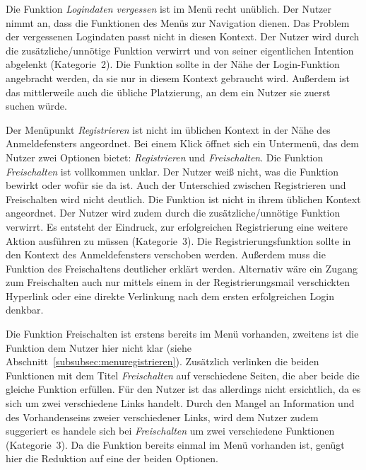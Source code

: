 {Die Funktion \emph{Logindaten vergessen} ist im Menü recht unüblich. Der Nutzer nimmt an, dass die Funktionen des Menüs zur Navigation dienen. Das Problem der vergessenen Logindaten passt nicht in diesen Kontext.
}
{Der Nutzer wird durch die zusätzliche/unnötige Funktion verwirrt und von seiner eigentlichen Intention abgelenkt (Kategorie~2).
}
{Die Funktion sollte in der Nähe der Login-Funktion angebracht werden, da sie nur in diesem Kontext gebraucht wird. Außerdem ist das mittlerweile auch die übliche Platzierung, an dem ein Nutzer sie zuerst suchen würde.
}\label{prob:start:pkt:login}

{Der Menüpunkt \emph{Registrieren} ist nicht im üblichen Kontext in der Nähe des Anmeldefensters angeordnet. Bei einem Klick öffnet sich ein Untermenü, das dem Nutzer zwei Optionen bietet: \emph{Registrieren} und \emph{Freischalten}.
Die Funktion \emph{Freischalten} ist vollkommen unklar. Der Nutzer weiß nicht, was die Funktion bewirkt oder wofür sie da ist. Auch der Unterschied zwischen Registrieren und Freischalten wird nicht deutlich.
}{Die Funktion ist nicht in ihrem üblichen Kontext angeordnet. Der Nutzer wird zudem durch die zusätzliche/unnötige Funktion verwirrt. Es entsteht der Eindruck, zur erfolgreichen Registrierung eine weitere Aktion ausführen zu müssen (Kategorie~3).}
{Die Registrierungsfunktion sollte in den Kontext des Anmeldefensters verschoben werden. Außerdem muss die Funktion des Freischaltens deutlicher erklärt werden. Alternativ wäre ein Zugang zum Freischalten auch nur mittels einem in der Registrierungsmail verschickten Hyperlink oder eine direkte Verlinkung nach dem ersten erfolgreichen Login denkbar.
}\label{prob:start:pkt:reg}

{Die Funktion Freischalten ist erstens bereits im Menü vorhanden, zweitens ist die Funktion dem Nutzer hier nicht klar (siehe Abschnitt~\ref{subsubsec:menuregistrieren}). 
Zusätzlich verlinken die beiden Funktionen mit dem Titel \emph{Freischalten} auf verschiedene Seiten, die aber beide die gleiche Funktion erfüllen. Für den Nutzer ist das allerdings nicht ersichtlich, da es sich um zwei verschiedene Links handelt.
}
{Durch den Mangel an Information und des Vorhandenseins zweier verschiedener Links, wird dem Nutzer zudem suggeriert es handele sich bei \emph{Freischalten} um zwei verschiedene Funktionen (Kategorie~3).
}
{
Da die Funktion bereits einmal im Menü vorhanden ist, genügt hier die Reduktion auf eine der beiden Optionen.
}\label{prob:start:pkt:frei}

